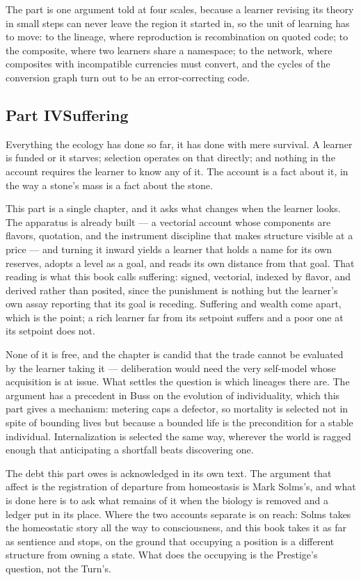 \documentclass[12pt,openright,twoside]{book}
\theoremstyle{remark}
\theoremstyle{plain}
\theoremstyle{remark}
\theoremstyle{plain}
\theoremstyle{plain}
\begin{document}
The part is one argument told at four scales, because a learner revising
its theory in small steps can never leave the region it started in, so
the unit of learning has to move: to the lineage, where reproduction is
recombination on quoted code; to the composite, where two learners share
a namespace; to the network, where composites with incompatible
currencies must convert, and the cycles of the conversion graph turn out
to be an error-correcting code.

\subsection*{Part IV\quad Suffering}

Everything the ecology has done so far, it has done with mere survival.
A learner is funded or it starves; selection operates on that directly;
and nothing in the account requires the learner to know any of it.
The account is a fact about it, in the way a stone's mass is a fact about
the stone.

This part is a single chapter, and it asks what changes when the learner
looks.
The apparatus is already built --- a vectorial account whose components
are flavors, quotation, and the instrument discipline that makes
structure visible at a price --- and turning it inward yields a learner
that holds a name for its own reserves, adopts a level as a goal, and
reads its own distance from that goal.
That reading is what this book calls suffering: signed, vectorial,
indexed by flavor, and derived rather than posited, since the punishment
is nothing but the learner's own assay reporting that its goal is
receding.
Suffering and wealth come apart, which is the point; a rich learner far
from its setpoint suffers and a poor one at its setpoint does not.

None of it is free, and the chapter is candid that the trade cannot be
evaluated by the learner taking it --- deliberation would need the very
self-model whose acquisition is at issue.
What settles the question is which lineages there are.
The argument has a precedent in Buss on the evolution of individuality,
which this part gives a mechanism: metering caps a defector, so mortality
is selected not in spite of bounding lives but because a bounded life is
the precondition for a stable individual.
Internalization is selected the same way, wherever the world is ragged
enough that anticipating a shortfall beats discovering one.

The debt this part owes is acknowledged in its own text.
The argument that affect is the registration of departure from
homeostasis is Mark Solms's, and what is done here is to ask what remains
of it when the biology is removed and a ledger put in its place.
Where the two accounts separate is on reach: Solms takes the homeostatic
story all the way to consciousness, and this book takes it as far as
sentience and stops, on the ground that occupying a position is a
different structure from owning a state.
What does the occupying is the Prestige's question, not the Turn's.
\end{document}
